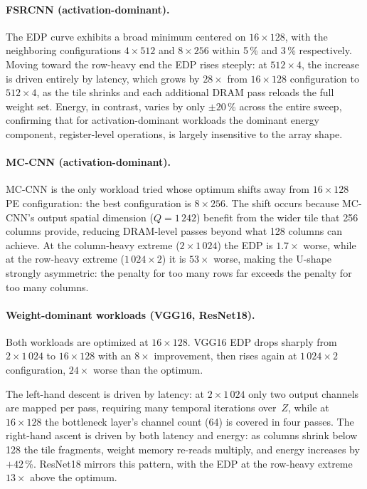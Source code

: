 \paragraph{FSRCNN (activation-dominant).}
The EDP curve exhibits a broad minimum centered on $16 \times 128$, with the neighboring
configurations $4 \times 512$ and $8 \times 256$ within
5\,\% and 3\,\% respectively.
Moving toward the row-heavy end the EDP rises steeply: at $512 \times 4$, the increase is driven entirely by latency, which grows by $28\times$
from $16 \times 128$ configuration to $512 \times 4$, as the tile
shrinks and each additional DRAM pass reloads the full weight set.
Energy, in contrast, varies by only $\pm 20$\,\% across the entire
sweep, confirming that for activation-dominant workloads the dominant energy component, register-level operations, is largely insensitive to the
array shape.

\paragraph{MC-CNN (activation-dominant).}
MC-CNN is the only workload tried whose optimum shifts away from
$16 \times 128$ PE configuration: the best configuration is $8 \times 256$.
The shift occurs because MC-CNN's output spatial dimension
($Q = 1\,242$) benefit from the wider tile that 256
columns provide, reducing DRAM-level passes beyond what 128 columns
can achieve.
At the column-heavy extreme ($2 \times 1\,024$) the EDP is
$1.7\times$ worse, while at the row-heavy
extreme ($1\,024 \times 2$) it is
$53\times$ worse, making the U-shape strongly
asymmetric: the penalty for too many rows far exceeds the penalty for
too many columns.

\paragraph{Weight-dominant workloads (VGG16, ResNet18).}
Both workloads are optimized at $16 \times 128$.
VGG16 EDP drops sharply from $2 \times 1\,024$ to $16 \times 128$ with an $8\times$ improvement, then rises again at $1\,024 \times 2$ configuration, $24\times$ worse than the optimum.

The left-hand descent is driven by latency: at $2 \times 1\,024$ only
two output channels are mapped per pass, requiring many temporal
iterations over~$Z$, while at $16 \times 128$ the bottleneck layer's
channel count (64) is covered in four passes.
The right-hand ascent is driven by both latency and energy: as columns
shrink below 128 the tile fragments, weight memory re-reads multiply, and
energy increases by $+42$\,\%.
ResNet18 mirrors this pattern, with the EDP at the row-heavy extreme
$13\times$ above the optimum.


